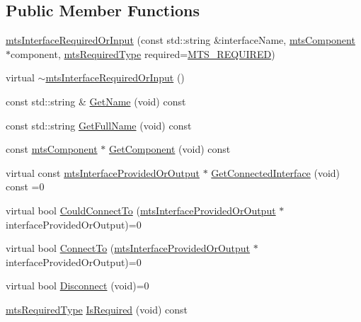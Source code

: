 \subsection*{Public Member Functions}
\begin{DoxyCompactItemize}
\item 
\hyperlink{classmts_interface_required_or_input_a5529989a70a76236d4e3570a6bf54442}{mts\+Interface\+Required\+Or\+Input} (const std\+::string \&interface\+Name, \hyperlink{classmts_component}{mts\+Component} $\ast$component, \hyperlink{mts_forward_declarations_8h_a9ef1ce54724afde7802db326ff8606f3}{mts\+Required\+Type} required=\hyperlink{mts_forward_declarations_8h_a9ef1ce54724afde7802db326ff8606f3ae01fd85391b60e546bbb1be9716c4ec9}{M\+T\+S\+\_\+\+R\+E\+Q\+U\+I\+R\+E\+D})
\item 
virtual \hyperlink{classmts_interface_required_or_input_aa9bc3cd4a8433df079e0adb2d2e472f5}{$\sim$mts\+Interface\+Required\+Or\+Input} ()
\item 
const std\+::string \& \hyperlink{classmts_interface_required_or_input_a9d8d6d995d2ec8dd155601964c8524ac}{Get\+Name} (void) const 
\item 
const std\+::string \hyperlink{classmts_interface_required_or_input_a1668fe8e128e77cceb33fd4ce8a053c3}{Get\+Full\+Name} (void) const 
\item 
const \hyperlink{classmts_component}{mts\+Component} $\ast$ \hyperlink{classmts_interface_required_or_input_af1f2fff7a84b86d7f3875e686247342a}{Get\+Component} (void) const 
\item 
virtual const \hyperlink{classmts_interface_provided_or_output}{mts\+Interface\+Provided\+Or\+Output} $\ast$ \hyperlink{classmts_interface_required_or_input_ac552961d38b4c5f03ba32771931083a6}{Get\+Connected\+Interface} (void) const =0
\item 
virtual bool \hyperlink{classmts_interface_required_or_input_abd19efe04fddce22bd751488f89cc34b}{Could\+Connect\+To} (\hyperlink{classmts_interface_provided_or_output}{mts\+Interface\+Provided\+Or\+Output} $\ast$interface\+Provided\+Or\+Output)=0
\item 
virtual bool \hyperlink{classmts_interface_required_or_input_ac156fd8b187afa072f59d13c6e775787}{Connect\+To} (\hyperlink{classmts_interface_provided_or_output}{mts\+Interface\+Provided\+Or\+Output} $\ast$interface\+Provided\+Or\+Output)=0
\item 
virtual bool \hyperlink{classmts_interface_required_or_input_a8c7c1b7c1914444225f16f0900784717}{Disconnect} (void)=0
\item 
\hyperlink{mts_forward_declarations_8h_a9ef1ce54724afde7802db326ff8606f3}{mts\+Required\+Type} \hyperlink{classmts_interface_required_or_input_a59397ab0b1f8234f525ebe3e010599e6}{Is\+Required} (void) const 
\end{DoxyCompactItemize}
